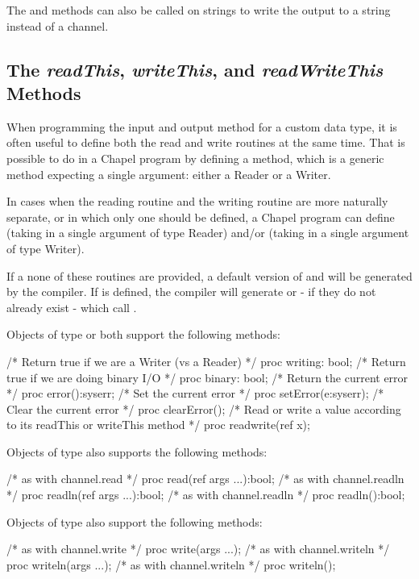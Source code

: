 The  and  methods can also be called on
strings to write the output to a string instead of a channel.




\subsection{The {\em readThis}, {\em writeThis}, and {\em readWriteThis} Methods}

When programming the input and output method for a custom data type, it is often useful to define both the read and write routines at the same time. That is possible to do in a Chapel program by defining a  method, which is a generic method expecting a single argument: either a Reader or a Writer.

In cases when the reading routine and the writing routine are more naturally separate, or in which only one should be defined, a Chapel program can define  (taking in a single argument of type Reader) and/or  (taking in a single argument of type Writer). 

If a none of these routines are provided, a default version of  and  will be generated by the compiler. If  is defined, the compiler will generate  or  - if they do not already exist - which call .

Objects of type  or  both support the following methods:
\begin{chapel}
  /* Return true if we are a Writer (vs a Reader) */
  proc writing: bool;
  /* Return true if we are doing binary I/O */
  proc binary: bool;
  /* Return the current error */
  proc error():syserr;
  /* Set the current error */
  proc setError(e:syserr);
  /* Clear the current error */
  proc clearError();
  /* Read or write a value according to its readThis or writeThis method */
  proc readwrite(ref x);
\end{chapel}

Objects of type  also supports the following methods:
\begin{chapel}
  /* as with channel.read */
  proc read(ref args ...):bool;
  /* as with channel.readln */
  proc readln(ref args ...):bool;
  /* as with channel.readln */
  proc readln():bool;
\end{chapel}
Objects of type  also support the following methods:
\begin{chapel}
  /* as with channel.write */
  proc write(args ...);
  /* as with channel.writeln */
  proc writeln(args ...);
  /* as with channel.writeln */
  proc writeln();
\end{chapel}

